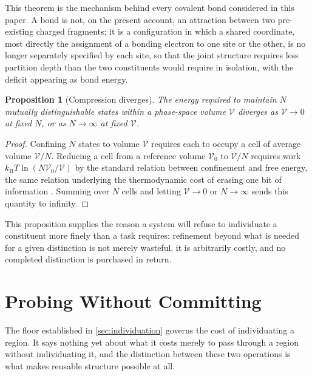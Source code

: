 \documentclass[11pt,twocolumn,a4paper]{article}
\theoremstyle{plain}
\newtheorem{proposition}[theorem]{Proposition}
\theoremstyle{definition}
\theoremstyle{remark}
\newcommand{\kB}{k_{\mathrm{B}}}
\begin{document}
This theorem is the mechanism behind every covalent bond considered in this
paper. A bond is not, on the present account, an attraction between two
pre-existing charged fragments; it is a configuration in which a shared
coordinate, most directly the assignment of a bonding electron to one site
or the other, is no longer separately specified by each site, so that the
joint structure requires less partition depth than the two constituents
would require in isolation, with the deficit appearing as bond energy.

\begin{proposition}[Compression diverges]
\label{prop:compression}
The energy required to maintain $N$ mutually distinguishable states within
a phase-space volume $\mathcal{V}$ diverges as $\mathcal{V} \to 0$ at fixed
$N$, or as $N \to \infty$ at fixed $\mathcal{V}$.
\end{proposition}

\begin{proof}
Confining $N$ states to volume $\mathcal{V}$ requires each to occupy a cell
of average volume $\mathcal{V}/N$. Reducing a cell from a reference volume
$\mathcal{V}_0$ to $\mathcal{V}/N$ requires work $\kB T \ln(N\mathcal{V}_0 /
\mathcal{V})$ by the standard relation between confinement and free energy,
the same relation underlying the thermodynamic cost of erasing one bit of
information \citep{landauer1961}. Summing over $N$ cells and letting
$\mathcal{V} \to 0$ or $N \to \infty$ sends this quantity to infinity.
\end{proof}

This proposition supplies the reason a system will refuse to individuate a
constituent more finely than a task requires: refinement beyond what is
needed for a given distinction is not merely wasteful, it is arbitrarily
costly, and no completed distinction is purchased in return.

\section{Probing Without Committing}
\label{sec:asymmetry}

The floor established in \cref{sec:individuation} governs the cost of
individuating a region. It says nothing yet about what it costs merely to
pass through a region without individuating it, and the distinction between
these two operations is what makes reusable structure possible at all.
\end{document}
